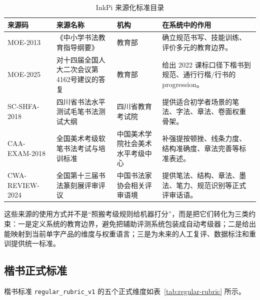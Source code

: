 \documentclass[UTF8,a4paper,12pt,fontset=none]{ctexart}
\begin{document}
\begin{table}[H]
  \centering
  \caption{InkPi 来源化标准目录}
  \label{tab:sources}
  \begin{tabularx}{\textwidth}{>{\raggedright\arraybackslash}p{2.1cm} >{\raggedright\arraybackslash}p{4.7cm} >{\raggedright\arraybackslash}p{3.1cm} X}
    \toprule
    来源码 & 来源名称 & 机构 & 在系统中的作用 \\
    \midrule
    MOE-2013 & 《中小学书法教育指导纲要》 \cite{moe2013} & 教育部 & 确立规范书写、技能训练、评价多元的教育边界。 \\
    MOE-2025 & 对十四届全国人大二次会议第4162号建议的答复 \cite{moe2025} & 教育部 & 给出 2022 课标口径下楷书到规范、通行行楷/行书的 progression。 \\
    SC-SHFA-2018 & 四川省书法水平测试毛笔书法测试大纲 \cite{sc2018} & 四川省教育考试院 & 提供适合初学者场景的笔法、字法、章法、卷面权重骨架。 \\
    CAA-EXAM-2018 & 全国美术考级软笔书法考试与培训标准 \cite{caa2018} & 中国美术学院社会美术水平考级中心 & 补强提按顿挫、线条力度、结构准确度、章法完善等标准表述。 \\
    CWA-REVIEW-2024 & 全国第十三届书法篆刻展评审评议 \cite{cwa2024} & 中国书法家协会相关评审语境 & 提供笔法、结构、章法、墨法、笔力、规范识别等正式评审话语。 \\
    \bottomrule
  \end{tabularx}
\end{table}

这些来源的使用方式并不是“照搬考级规则给机器打分”，而是把它们转化为三类约束：一是定义系统的教育边界，避免把辅助评测系统包装成自动考级器；二是给出能映射到当前单字产品的维度与权重语言；三是为未来的人工复评、数据标注和重训提供统一标准。

\subsection{楷书正式标准}
楷书标准 \texttt{regular\_rubric\_v1} 的五个正式维度如表~\ref{tab:regular-rubric} 所示。
\end{document}
